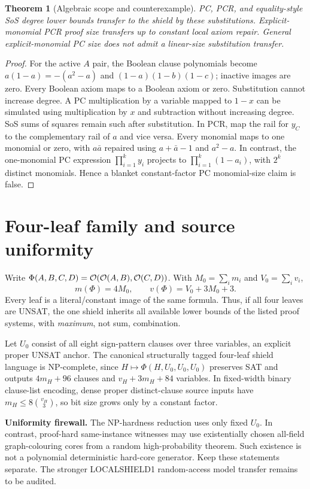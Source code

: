 \documentclass[11pt]{article}
\newtheorem{theorem}{Theorem}
\begin{document}
\begin{theorem}[Algebraic scope and counterexample]
PC, PCR, and equality-style SoS \emph{degree} lower bounds
transfer to the shield by these substitutions. Explicit-monomial
PCR proof size transfers up to constant local axiom repair.
General explicit-monomial PC size does not admit a linear-size
substitution transfer.
\end{theorem}
\begin{proof}
For the active $A$ pair, the Boolean clause polynomials become
$a(1-a)=-(a^2-a)$ and $(1-a)(1-b)(1-c)$; inactive images are
zero. Every Boolean axiom maps to a Boolean axiom or zero.
Substitution cannot increase degree. A PC multiplication by
a variable mapped to $1-x$ can be simulated using multiplication
by $x$ and subtraction without increasing degree. SoS sums of
squares remain such after substitution. In PCR, map the rail for
$y_C$ to the complementary rail of $a$ and vice versa.
Every monomial maps to one monomial or zero, with
$a\bar a$ repaired using $a+\bar a-1$ and $a^2-a$.
In contrast, the one-monomial PC expression
$\prod_{i=1}^k y_i$ projects to
$\prod_{i=1}^k(1-a_i)$, with $2^k$ distinct monomials.
Hence a blanket constant-factor PC monomial-size claim is false.
\end{proof}

\section{Four-leaf family and source uniformity}
Write $\Phi(A,B,C,D)={\cal O}({\cal O}(A,B),{\cal O}(C,D))$.
With $M_0=\sum_i m_i$ and $V_0=\sum_i v_i$,
\[
m(\Phi)=4M_0,\qquad v(\Phi)=V_0+3M_0+3.
\]
Every leaf is a literal/constant image of the same formula.
Thus, if all four leaves are UNSAT, the one shield inherits
all available lower bounds of the listed proof systems,
with \emph{maximum}, not sum, combination.

Let $U_0$ consist of all eight sign-pattern clauses
over three variables, an explicit proper UNSAT anchor.
The canonical structurally tagged four-leaf shield language
is NP-complete, since
$H\mapsto\Phi(H,U_0,U_0,U_0)$ preserves SAT and outputs
$4m_H+96$ clauses and $v_H+3m_H+84$ variables.
In fixed-width binary clause-list encoding, dense proper
distinct-clause source inputs have $m_H\le8\binom{v_H}{3}$,
so bit size grows only by a constant factor.

\noindent\textbf{Uniformity firewall.}
The NP-hardness reduction uses only fixed $U_0$. In contrast,
proof-hard same-instance witnesses may use existentially
chosen all-field graph-colouring cores from a random
high-probability theorem. Such existence is not a polynomial
deterministic hard-core generator. Keep these statements separate.
The stronger LOCALSHIELD1 random-access model transfer
remains to be audited.
\end{document}
